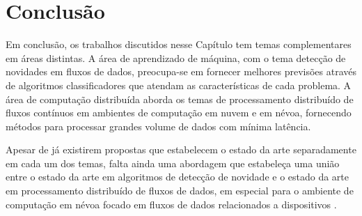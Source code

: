 \section{Conclusão}\label{sec:conclusao-relacionados}


Em conclusão, os trabalhos discutidos nesse Capítulo tem temas complementares em
áreas distintas.
A área de aprendizado de máquina, com o tema detecção de novidades em fluxos de
dados, preocupa-se em fornecer melhores previsões através de algoritmos
classificadores que atendam as características de cada problema.
A área de computação distribuída aborda os temas de processamento distribuído
de fluxos contínuos em ambientes de computação em nuvem e em névoa, fornecendo
métodos para processar grandes volume de dados com mínima latência.

Apesar de já existirem propostas que estabelecem o estado da arte separadamente
em cada um dos temas, falta ainda uma abordagem que estabeleça uma união entre o
estado da arte em algoritmos de detecção de novidade e o estado da arte em
processamento distribuído de fluxos de dados, em especial para o ambiente de
computação em névoa focado em fluxos de dados relacionados a dispositivos \iot.
